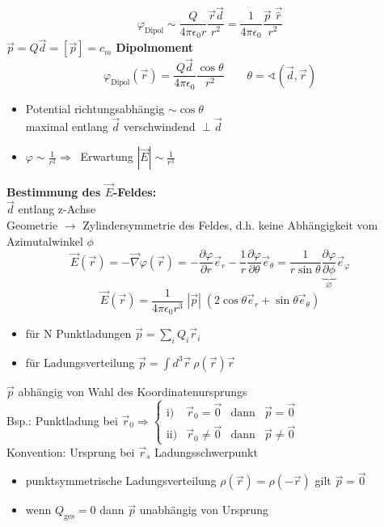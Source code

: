 \documentclass[titlepage,12pt,a4paper,ngerman]{report}
\newcommand{\tx}[1]{\textrm{#1}}
\begin{document}
$$\varphi_{\tx{Dipol}} \sim \frac{Q}{4\pi\epsilon_0 r} \frac{\vec{r}\vec{d}}{r^2} = \frac{1}{4\pi\epsilon_0} \frac{\vec{p}\;\vec{\hat{r}}}{r^2} $$
$ \vec{p} = Q \vec{d} = [\vec{p}] = c_m$ \textbf{Dipolmoment}
$$\varphi_{\tx{Dipol}} (\vec{r}) = \frac{Q\vec{d}}{4\pi\epsilon_0} \frac{\cos \theta}{r^2} \qquad \theta = \sphericalangle (\vec{d}, \vec{r})$$
\begin{itemize}
\item Potential richtungsabhängig $\sim \cos \theta$\\
maximal entlang $\vec{d}$ verschwindend $\perp \vec{d}$
\item $\varphi \sim \frac{1}{r^2} \Rightarrow \ $ Erwartung $|\vec{E}| \sim \frac{1}{r^3}$
\end{itemize}
\textbf{Bestimmung des $\vec{E}$-Feldes:}\\
$\vec{d}$ entlang z-Achse\\
Geometrie $\rightarrow$ Zylindersymmetrie des Feldes, d.h. keine Abhängigkeit vom Azimutalwinkel $\phi$ 
$$\vec{E}(\vec{r}) = - \vec{\nabla} \varphi(\vec{r}) = -\frac{\partial \varphi}{\partial r} \vec{e}_r - \frac{1}{r} \frac{\partial \varphi}{\partial \theta} \vec{e}_\theta = \frac{1}{r \sin \theta} \underbrace{\frac{\partial \varphi}{\partial \phi}}_{\varnothing} \vec{e}_\varphi$$
$$ \vec{E} (\vec{r}) = \frac{1}{4\pi\epsilon_0 r^3} \; |\vec{p}| \; (2 \cos \theta \vec{e}_r + \sin \theta \vec{e}_\theta ) $$
\begin{itemize}
\item für N Punktladungen $\vec{p} = \sum_i Q_i \vec{r}_i$
\item für Ladungsverteilung $\vec{p} = \int d^3 \vec{r} \ \rho (\vec{r}) \vec{r} $
\end{itemize}
$\vec{p}$ abhängig von Wahl des Koordinatenursprungs\\[10pt]
Bsp.: Punktladung bei $\vec{r}_0 \Rightarrow \left\{ \begin{array}{cccc}
\textrm{i)} & \vec{r}_0 = \vec{0} & \textrm{dann} & \vec{p} = \vec{0} \\
\textrm{ii)} & \vec{r}_0 \neq \vec{0} & \textrm{dann} & \vec{p} \neq \vec{0}
\end{array} \right. $ \\[10pt]
Konvention: Ursprung bei $\vec{r}_s$ Ladungsschwerpunkt
\begin{itemize}
\item punktsymmetrische Ladungsverteilung $ \rho(\vec{r}) = \rho(-\vec{r})$ gilt $\vec{p} = \vec{0}$
\item wenn $Q_{\tx{ges}} = 0$ dann $\vec{p}$ unabhängig von Ursprung
\end{itemize}
\end{document}
